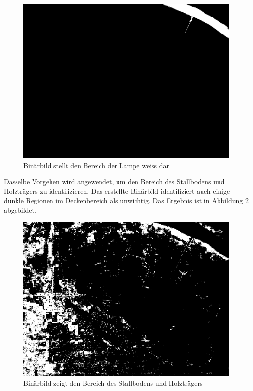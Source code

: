 \begin{figure}[H]
	\center
	\includegraphics[scale=0.25]{Grafiken/entwicklung/3binBildLampe.jpg}
	\caption{Binärbild stellt den Bereich der Lampe weiss dar} 
	\label{fig: Binärbild stellt den Bereich der Lampe weiss dar}
\end{figure}

Dasselbe Vorgehen wird angewendet, um den Bereich des Stallbodens und Holzträgers zu identifizieren. Das erstellte Binärbild identifiziert auch einige dunkle Regionen im Deckenbereich als unwichtig. Das Ergebnis ist in Abbildung \ref{fig: Binärbild zeigt den Bereich des Stallbodens und Holzträgers} abgebildet.
\begin{figure}[H]
	\center
	\includegraphics[scale=0.25]{Grafiken/entwicklung/4binBildHolz.jpg}
	\caption{Binärbild zeigt den Bereich des Stallbodens und Holzträgers} 
	\label{fig: Binärbild zeigt den Bereich des Stallbodens und Holzträgers}
\end{figure}

